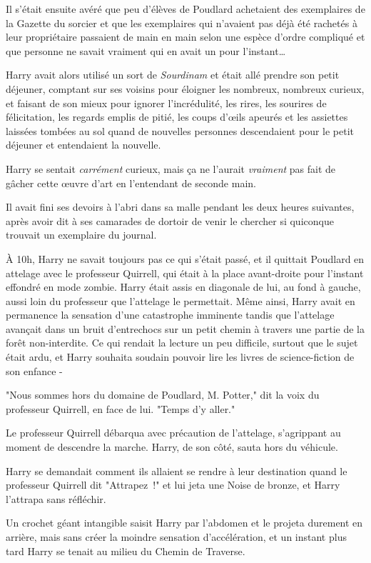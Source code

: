 Il s'était ensuite avéré que peu d'élèves de Poudlard achetaient des exemplaires de la Gazette du sorcier et que les exemplaires qui n'avaient pas déjà été rachetés à leur propriétaire passaient de main en main selon une espèce d'ordre compliqué et que personne ne savait vraiment qui en avait un pour l'instant…

Harry avait alors utilisé un sort de \emph{Sourdinam} et était allé prendre son petit déjeuner, comptant sur ses voisins pour éloigner les nombreux, nombreux curieux, et faisant de son mieux pour ignorer l'incrédulité, les rires, les sourires de félicitation, les regards emplis de pitié, les coups d'œils apeurés et les assiettes laissées tombées au sol quand de nouvelles personnes descendaient pour le petit déjeuner et entendaient la nouvelle.

Harry se sentait \emph{carrément} curieux, mais ça ne l'aurait \emph{vraiment} pas fait de gâcher cette œuvre d'art en l'entendant de seconde main.

Il avait fini ses devoirs à l'abri dans sa malle pendant les deux heures suivantes, après avoir dit à ses camarades de dortoir de venir le chercher si quiconque trouvait un exemplaire du journal.

À 10h, Harry ne savait toujours pas ce qui s'était passé, et il quittait Poudlard en attelage avec le professeur Quirrell, qui était à la place avant-droite pour l'instant effondré en mode zombie. Harry était assis en diagonale de lui, au fond à gauche, aussi loin du professeur que l'attelage le permettait. Même ainsi, Harry avait en permanence la sensation d'une catastrophe imminente tandis que l'attelage avançait dans un bruit d'entrechocs sur un petit chemin à travers une partie de la forêt non-interdite. Ce qui rendait la lecture un peu difficile, surtout que le sujet était ardu, et Harry souhaita soudain pouvoir lire les livres de science-fiction de son enfance -

"Nous sommes hors du domaine de Poudlard, M. Potter," dit la voix du professeur Quirrell, en face de lui. "Temps d'y aller."

Le professeur Quirrell débarqua avec précaution de l'attelage, s'agrippant au moment de descendre la marche. Harry, de son côté, sauta hors du véhicule.

Harry se demandait comment ils allaient se rendre à leur destination quand le professeur Quirrell dit "Attrapez~!" et lui jeta une Noise de bronze, et Harry l'attrapa sans réfléchir.

Un crochet géant intangible saisit Harry par l'abdomen et le projeta durement en arrière, mais sans créer la moindre sensation d'accélération, et un instant plus tard Harry se tenait au milieu du Chemin de Traverse.

